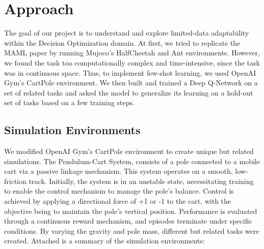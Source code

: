 \documentclass[runningheads]{llncs}
\begin{document}
\section{Approach}
The goal of our project is to understand and explore
limited-data adaptability within the Decision Optimization domain. At first, we tried to replicate the MAML paper by running Mujoco's HalfCheetah and Ant environments. However, we found the task too computationally complex and time-intensive, since the task was in continuous space. Thus, to implement few-shot learning, we used OpenAI Gym's CartPole environment. We then built and trained a Deep Q-Network on a set of related tasks and asked the model to generalize its learning on a hold-out set of tasks based on a few training steps.

\subsection{Simulation Environments} 

We modified OpenAI Gym's CartPole environment to create unique but related simulations. The Pendulum-Cart System, consists of a pole connected to a mobile cart via a passive linkage mechanism. This system operates on a smooth, low-friction track. Initially, the system is in an unstable state, necessitating training to enable the control mechanism to manage the pole's balance. Control is achieved by applying a directional force of +1 or -1 to the cart, with the objective being to maintain the pole's vertical position. Performance is evaluated through a continuous reward mechanism, and episodes terminate under specific conditions. By varying the gravity and pole mass, different but related tasks were created. Attached is a summary of the simulation environments:
\end{document}
